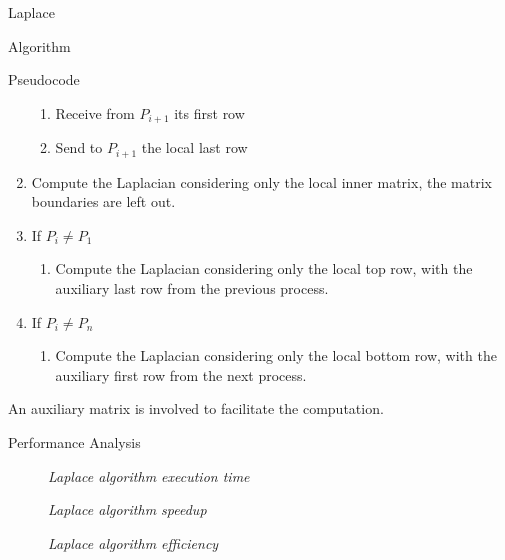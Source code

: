 \begin{chapter}{Laplace}
\begin{section}{Algorithm}
\begin{subsection}{Pseudocode}
\begin{enumerate}
                \begin{enumerate}
                    \item Receive from $P_{i+1}$ its first row
                    \item Send to $P_{i+1}$ the local last row
                \end{enumerate}
                \item Compute the Laplacian considering only the local inner matrix, the matrix boundaries are left out.
                \item If $P_i \neq P_1$
                \begin{enumerate}
                    \item Compute the Laplacian considering only the local top row, with the auxiliary last row from the previous process.
                \end{enumerate}
                \item If $P_i \neq P_n$
                \begin{enumerate}
                    \item Compute the Laplacian considering only the local bottom row, with the auxiliary first row from the next process.
                \end{enumerate}
            \end{enumerate}
            An auxiliary matrix is involved to facilitate the computation.
            
            
        \end{subsection}
        \clearpage
        \begin{subsection}{Performance Analysis}
            \begin{figure}[ht]
                \centering
                
                \caption{\emph{Laplace algorithm execution time}}
                \label{fig:laplace-exectime}
            \end{figure}
            \begin{figure}[ht]
                \centering
                
                \caption{\emph{Laplace algorithm speedup}}
                \label{fig:laplace-speedup}
            \end{figure}
            \begin{figure}[ht]
                \centering
                
                \caption{\emph{Laplace algorithm efficiency}}
                \label{fig:laplace-efficiency}
            \end{figure}


\end{subsection}
\end{section}
\end{chapter}
